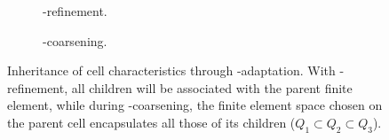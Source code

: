 \begin{figure}
\begin{subfigure}{.5\textwidth}
  \centering
  
  \caption{\hp-refinement.}
\end{subfigure}
\begin{subfigure}{.5\textwidth}
  \centering
  
  \caption{\hp-coarsening.}
\end{subfigure}
\caption[Inheritance of cell characteristics through \hp-adaptation.]{Inheritance of cell characteristics through \hp-adaptation. With \hp-refinement, all children will be associated with the parent finite element, while during \hp-coarsening, the finite element space chosen on the parent cell encapsulates all those of its children ($Q_1 \subset Q_2 \subset Q_3$).}
\label{fig:adaptation}
\end{figure}